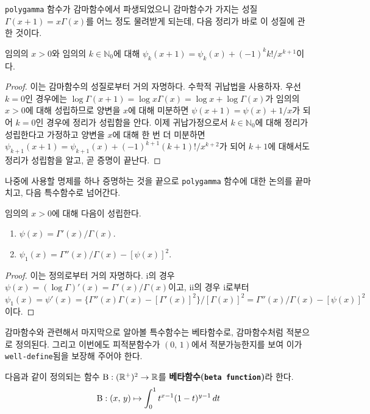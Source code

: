 \texttt{polygamma} 함수가 감마함수에서 파생되었으니 감마함수가 가지는 성질 $\Gamma(x+1)=x\Gamma(x)$를 어느 정도 물려받게 되는데, 다음 정리가 바로 이 성질에 관한 것이다.

\begin{theorem}
    임의의 $x>0$와 임의의 $k\in\mathbb{N}_0$에 대해 $\psi_k(x+1)=\psi_k(x)+(-1)^kk!/x^{k+1}$이다.
\end{theorem}

\begin{proof}
    이는 감마함수의 성질로부터 거의 자명하다. 수학적 귀납법을 사용하자. 우선 $k=0$인 경우에는 $\log\Gamma(x+1)=\log x\Gamma(x)=\log x+\log\Gamma(x)$가 임의의 $x>0$에 대해 성립하므로 양변을 $x$에 대해 미분하면 $\psi(x+1)=\psi(x)+1/x$가 되어 $k=0$인 경우에 정리가 성립함을 안다. 이제 귀납가정으로서 $k\in\mathbb{N}_0$에 대해 정리가 성립한다고 가정하고 양변을 $x$에 대해 한 번 더 미분하면 $\psi_{k+1}(x+1)=\psi_{k+1}(x)+(-1)^{k+1}(k+1)!/x^{k+2}$가 되어 $k+1$에 대해서도 정리가 성립함을 알고, 곧 증명이 끝난다.
\end{proof}

나중에 사용할 명제를 하나 증명하는 것을 끝으로 \texttt{polygamma} 함수에 대한 논의를 끝마치고, 다음 특수함수로 넘어간다.

\begin{proposition}
    임의의 $x>0$에 대해 다음이 성립한다.
    \begin{enumerate}
        \item $\psi(x)=\Gamma'(x)/\Gamma(x)$.
        \item $\psi_1(x)=\Gamma''(x)/\Gamma(x)-[\psi(x)]^2$.
    \end{enumerate}
\end{proposition}

\begin{proof}
    이는 정의로부터 거의 자명하다. i의 경우 $\psi(x)=(\log\Gamma)'(x)=\Gamma'(x)/\Gamma(x)$이고, ii의 경우 i로부터 $\psi_1(x)=\psi'(x)=\{\Gamma''(x)\Gamma(x)-[\Gamma'(x)]^2\}/[\Gamma(x)]^2=\Gamma''(x)/\Gamma(x)-[\psi(x)]^2$이다.
\end{proof}

감마함수와 관련해서 마지막으로 알아볼 특수함수는 베타함수로, 감마함수처럼 적분으로 정의된다. 그리고 이번에도 피적분함수가 $(0,\,1)$에서 적분가능한지를 보여 이가 \texttt{well-define}됨을 보장해 주어야 한다.

\begin{definition}
    다음과 같이 정의되는 함수 $\mathrm{B}:(\mathbb{R}^+)^2\to\mathbb{R}$를 \textbf{베타함수(\texttt{beta function})}라 한다.
    \begin{equation*}
        \mathrm{B}:(x,\,y)\mapsto\int_0^1t^{x-1}(1-t)^{y-1}\,dt
    \end{equation*}
\end{definition}

